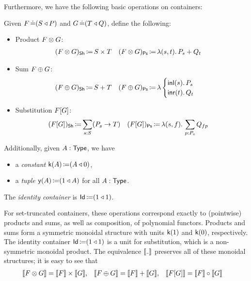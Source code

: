 Furthermore, we have the following basic operations on containers:
\begin{definition}\label{container-operations}
  Given \( F \operatorname{\mathrel{\doteq}} (S\mathbin{\triangleleft}P) \) and \( G \operatorname{\mathrel{\doteq}} (T\mathbin{\triangleleft}Q) \), define the following:
  \begin{itemize}
    \item Product \( F \mathbin{\otimes} G \):
      \begin{align*}
        (F \mathbin{\otimes} G)_{\operatorname{\mathsf{Sh}}} &\operatorname{\mathrel{\coloneq}} S \times T
          &
        (F \mathbin{\otimes} G)_{\operatorname{\mathsf{Ps}}} &\operatorname{\mathrel{\coloneq}} \lambda (s, t).\, P_s + Q_t
      \end{align*}
    \item Sum \( F \mathbin{\oplus} G \):
      \begin{align*}
        (F \mathbin{\oplus} G)_{\operatorname{\mathsf{Sh}}} &\operatorname{\mathrel{\coloneq}} S + T
          &
        (F \mathbin{\oplus} G)_{\operatorname{\mathsf{Ps}}} &\operatorname{\mathrel{\coloneq}}
          \lambda
          \begin{cases}
            \operatorname{\mathsf{inl}}(s).\, P_s \\
            \operatorname{\mathsf{inr}}(t).\, Q_t
          \end{cases}
      \end{align*}
    \item Substitution \( F\lbrack G\rbrack \):
      \begin{align*}
        (F\lbrack G\rbrack)_{\operatorname{\mathsf{Sh}}} &\operatorname{\mathrel{\coloneq}} \sum_{s : S} (P_s \to T)
          &
        (F\lbrack G\rbrack)_{\operatorname{\mathsf{Ps}}} &\operatorname{\mathrel{\coloneq}} \lambda (s, f).\, \sum_{p : P_s} Q_{fp}
      \end{align*}
  \end{itemize}
  Additionally, given \( A : \operatorname{\mathsf{Type}} \), we have
  \begin{itemize}
    \item a \emph{constant} \( \mathsf{k}(A) \operatorname{\mathrel{\coloneq}} (A\mathbin{\triangleleft}0) \),
    \item a \emph{tuple} \( \mathsf{y}(A) \operatorname{\mathrel{\coloneq}} (1\mathbin{\triangleleft}A) \) for all \( A : \operatorname{\mathsf{Type}} \).
  \end{itemize}
  The \emph{identity container} is \( \mathsf{Id} \operatorname{\mathrel{\coloneq}} (1\mathbin{\triangleleft}1) \).
\end{definition}
For set-truncated containers,
these operations correspond exactly to (pointwise) products and sums, as well as composition, of polynomial functors.
Products and sums form a symmetric monoidal structure with units \( \mathsf{k}(1) \) and \( \mathsf{k}(0) \), respectively.
The identity container \( \mathsf{Id} \operatorname{\mathrel{\coloneq}} (1\mathbin{\triangleleft}1) \)
is a unit for substitution, which is a non-symmetric monoidal product.
The equivalence \( \Ext{\Blank} \) preserves all of these monoidal structures; it is easy to see that
\begin{align*}
  \llbracket F \mathbin{\otimes} G\rrbracket &= \llbracket F\rrbracket \times \llbracket G\rrbracket,
    &
  \llbracket F \mathbin{\oplus} G\rrbracket &= \llbracket F\rrbracket + \llbracket G\rrbracket,
    &
  \llbracket F\lbrack G\rbrack\rrbracket &= \llbracket F\rrbracket \circ \llbracket G\rrbracket
\end{align*}

